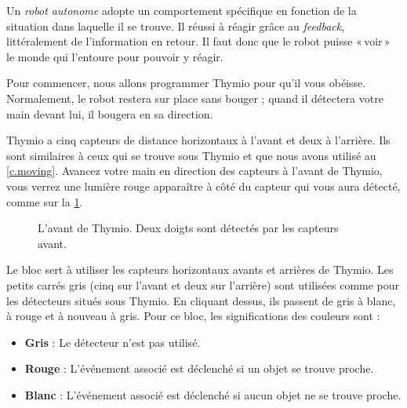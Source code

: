 \label{ch.pet}

Un \emph{robot autonome} adopte un comportement spécifique en fonction de la situation dans laquelle il se trouve.
Il réussi à réagir grâce au \textit{feedback}, littéralement de l'information en retour.
Il faut donc que le robot puisse «\,voir\,» le monde qui l'entoure pour pouvoir y réagir.


Pour commencer, nous allons programmer Thymio pour qu'il vous obéisse.
Normalement, le robot restera sur place sans bouger ; quand il détectera votre main devant lui, il bougera en sa direction.

Thymio a cinq capteurs de distance horizontaux à l'avant et deux à l'arrière.
Ils sont similaires à ceux qui se trouve sous Thymio et que nous avons utilisé au \cref{c.moving}.
Avancez votre main en direction des capteurs à l'avant de Thymio, vous verrez une lumière rouge apparaître à côté du capteur qui vous aura détecté, comme sur la \cref{fig.detect}.

\begin{figure}
\begin{center}
\caption{L'avant de Thymio. Deux doigts sont détectés par les capteurs avant.}\label{fig.detect}
\end{center}
\end{figure}

Le bloc  sert à utiliser les capteurs horizontaux avants et arrières de Thymio.
Les petits carrés gris (cinq sur l'avant et deux sur l'arrière) sont utilisées comme pour les détecteurs situés sous Thymio.
En cliquant dessus, ils passent de gris à blanc, à rouge et à nouveau à gris.
Pour ce bloc, les significations des couleurs sont :

\begin{itemize}
\item \textbf{Gris} : Le détecteur n'est pas utilisé.
\item \textbf{Rouge} : L'événement associé est déclenché si un objet se trouve proche.
\item \textbf{Blanc} : L'événement associé est déclenché si aucun objet ne se trouve proche.
\end{itemize}

